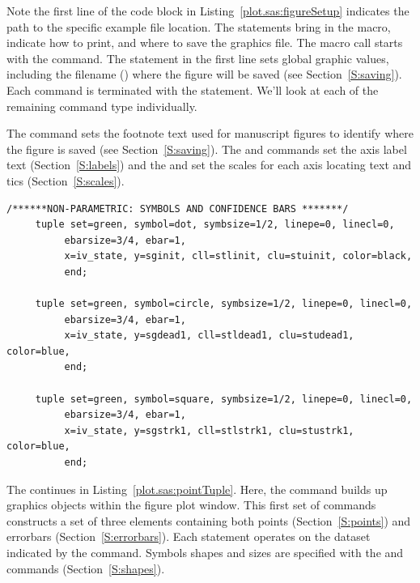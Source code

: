 \documentclass[nojss, letterpaper]{jss}\usepackage[]{graphicx}\usepackage[]{color}
\begin{document}
Note the first line of the code block in Listing~\ref{plot.sas:figureSetup} indicates the path to the specific example file location. The  statements bring in the  macro, indicate how to print, and where to save the graphics file. The  macro call starts with the  command. The  statement in the first line sets global graphic values, including the filename () where the figure will be saved (see Section~\ref{S:saving}). Each  command is terminated with the  statement. We'll look at each of the remaining command type individually.

The  command sets the footnote text used for manuscript figures to identify where the figure is saved (see Section~\ref{S:saving}). The  and  commands set the axis label text (Section~\ref{S:labels}) and the  and  set the scales for each axis locating text and tics (Section~\ref{S:scales}).

\begin{lstlisting}[float,floatplacement=!htpb, caption={plot.sas commands: points and errorbar tuple statements.}, label={plot.sas:pointTuple}]
     /******NON-PARAMETRIC: SYMBOLS AND CONFIDENCE BARS *******/
     tuple set=green, symbol=dot, symbsize=1/2, linepe=0, linecl=0,
          ebarsize=3/4, ebar=1,
          x=iv_state, y=sginit, cll=stlinit, clu=stuinit, color=black, 
          end;

     tuple set=green, symbol=circle, symbsize=1/2, linepe=0, linecl=0,
          ebarsize=3/4, ebar=1,
          x=iv_state, y=sgdead1, cll=stldead1, clu=studead1, color=blue, 
          end;
          
     tuple set=green, symbol=square, symbsize=1/2, linepe=0, linecl=0,
          ebarsize=3/4, ebar=1,
          x=iv_state, y=sgstrk1, cll=stlstrk1, clu=stustrk1, color=blue, 
          end;
\end{lstlisting}
The  continues in Listing~\ref{plot.sas:pointTuple}. Here, the  command builds up graphics objects within the figure plot window. This first set of  commands constructs a set of three elements containing both points (Section~\ref{S:points}) and errorbars (Section~\ref{S:errorbars}). Each  statement operates on the dataset indicated by the  command. Symbols shapes and sizes are specified with the  and  commands (Section~\ref{S:shapes}).
\end{document}
